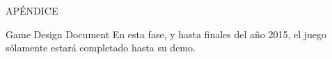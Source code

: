 \newpage
{}
\vspace*{\fill}
  \Large{APÉNDICE}
\vspace*{\fill}
\newpage

\begin{section}{Game Design Document}
  En esta fase, y hasta finales del año 2015, el juego sólamente estará completado hasta su demo.

  

\end{section}
